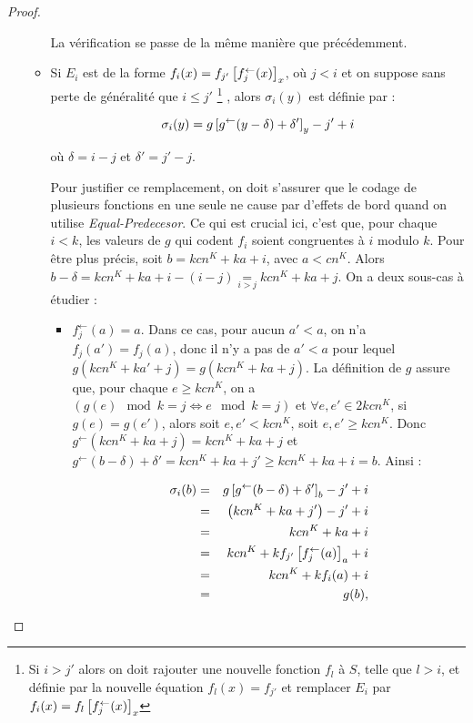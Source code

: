 \begin{appendices}
\begin{proof}
\begin{enumerate}[itemsep=-1mm,leftmargin=2cm]
\begin{itemize}[itemsep=-1mm, leftmargin=1cm]
					La vérification se passe de la même manière que précédemment.
					
					\item
					Si $E_i$ est de la forme $f_i(x) = f_{j'}\left[ f_j^{\leftarrow}(x) \right]_{x}$, où $j < i$ et on suppose sans perte de généralité que $i \leqslant j'$ 
					\footnote{Si $i > j'$ alors on doit rajouter une nouvelle fonction $f_l$ à $S$, telle que $l > i$, et définie par la nouvelle équation $f_l(x) = f_{j'}$ et remplacer $E_i$ par $f_i(x) = f_{l}\left[ f_j^{\leftarrow}(x) \right]_{x}$}
					, alors $\sigma_i(y)$ est définie par :
					
					\[
					\sigma_i(y) = g\left[ g^{\leftarrow}(y-\delta)  + \delta' \right]_{y} - j' + i
					\]
					
					où $\delta = i - j$ et $\delta' = j' - j$.
					
					Pour justifier ce remplacement, on doit s'assurer que le codage de plusieurs fonctions en une seule ne cause par d'effets de bord quand on utilise \emph{Equal-Predecesor}. Ce qui est crucial ici, c'est que, pour chaque $i<k$, les valeurs de $g$ qui codent $f_i$ soient congruentes à $i$ modulo $k$. Pour être plus précis, soit $b = kcn^K + ka + i$, avec $a< cn^K$. Alors $b-\delta = kcn^K + ka + i - (i - j) \underset{i>j}{=} kcn^K + ka + j$. On a deux sous-cas à étudier :
					
					\begin{itemize}[itemsep=-1mm,leftmargin=1cm]
						\item
						$f_j^{\leftarrow}(a) = a$.   Dans ce cas, pour aucun $a' < a$, on n'a $f_j(a') = f_j(a)$, donc il n'y a pas de $a' < a$ pour lequel $g\left( kcn^K + ka' + j \right) = g\left( kcn^K + ka + j \right)$. La définition de $g$ assure que, pour chaque $e \geqslant kcn^K$, on a $\left(g(e) \mod{k} = j \Leftrightarrow e \mod{k} = j\right)$ et $\forall e, e' \in 2kcn^K$, si $g(e) = g(e')$, alors soit $e, e' < kcn^K$, soit $e, e' \geqslant kcn^K$. Donc $g^{\leftarrow} \left( kcn^K + ka + j \right) = kcn^K + ka + j$ et $g^{\leftarrow}\left( b - \delta \right) + \delta' = kcn^K + ka + j' \geqslant kcn^K + ka + i = b$. Ainsi :
						
				 
						\begin{eqnarray}
						\sigma_i(b) 	& = &	g\left[ g^{\leftarrow}(b-\delta) +\delta' \right]_{b} - j' + i \\
						& = & 	\left( kcn^K + ka + j' \right) - j' + i \\
						& = & 	kcn^K + ka + i \\
						& = & 	kcn^K + k f_{j'}\left[ f_j^{\leftarrow}(a) \right]_{a} + i \\
						& = & 	kcn^K + k f_i(a) + i \\
						& = & 	g(b),
						\end{eqnarray}
						

\end{itemize}
\end{itemize}
\end{enumerate}
\end{proof}
\end{appendices}
